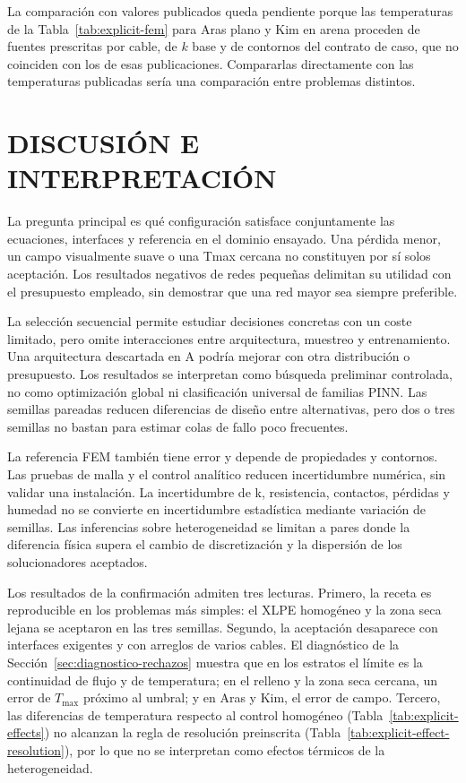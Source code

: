 La comparación con valores publicados queda pendiente porque las temperaturas de la Tabla~\ref{tab:explicit-fem} para Aras plano y Kim en arena proceden de fuentes prescritas por cable, de $k$ base y de contornos del contrato de caso, que no coinciden con los de esas publicaciones. Compararlas directamente con las temperaturas publicadas sería una comparación entre problemas distintos.

\section{DISCUSIÓN E INTERPRETACIÓN}
\label{sec:discusion}

La pregunta principal es qué configuración satisface conjuntamente las ecuaciones, interfaces y referencia en el dominio ensayado. Una pérdida menor, un campo visualmente suave o una Tmax cercana no constituyen por sí solos aceptación. Los resultados negativos de redes pequeñas delimitan su utilidad con el presupuesto empleado, sin demostrar que una red mayor sea siempre preferible.

La selección secuencial permite estudiar decisiones concretas con un coste limitado, pero omite interacciones entre arquitectura, muestreo y entrenamiento. Una arquitectura descartada en A podría mejorar con otra distribución o presupuesto. Los resultados se interpretan como búsqueda preliminar controlada, no como optimización global ni clasificación universal de familias PINN. Las semillas pareadas reducen diferencias de diseño entre alternativas, pero dos o tres semillas no bastan para estimar colas de fallo poco frecuentes.

La referencia FEM también tiene error y depende de propiedades y contornos. Las pruebas de malla y el control analítico reducen incertidumbre numérica, sin validar una instalación. La incertidumbre de k, resistencia, contactos, pérdidas y humedad no se convierte en incertidumbre estadística mediante variación de semillas. Las inferencias sobre heterogeneidad se limitan a pares donde la diferencia física supera el cambio de discretización y la dispersión de los solucionadores aceptados.

Los resultados de la confirmación admiten tres lecturas. Primero, la receta es reproducible en los problemas más simples: el XLPE homogéneo y la zona seca lejana se aceptaron en las tres semillas. Segundo, la aceptación desaparece con interfaces exigentes y con arreglos de varios cables. El diagnóstico de la Sección~\ref{sec:diagnostico-rechazos} muestra que en los estratos el límite es la continuidad de flujo y de temperatura; en el relleno y la zona seca cercana, un error de $T_{\max}$ próximo al umbral; y en Aras y Kim, el error de campo. Tercero, las diferencias de temperatura respecto al control homogéneo (Tabla~\ref{tab:explicit-effects}) no alcanzan la regla de resolución preinscrita (Tabla~\ref{tab:explicit-effect-resolution}), por lo que no se interpretan como efectos térmicos de la heterogeneidad.

